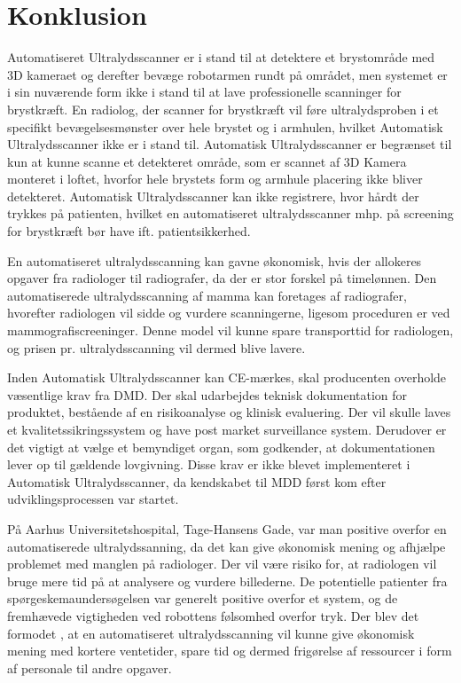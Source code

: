\chapter{Konklusion}\label{kapitel_Konklusion}
Automatiseret Ultralydsscanner er i stand til at detektere et brystområde med 3D kameraet og derefter bevæge robotarmen rundt på området, men systemet er i sin nuværende form ikke i stand til at lave professionelle scanninger for brystkræft. En radiolog, der scanner for brystkræft vil føre ultralydsproben i et specifikt bevægelsesmønster over hele brystet og i armhulen, hvilket Automatisk Ultralydsscanner ikke er i stand til. Automatisk Ultralydsscanner er begrænset til kun at kunne scanne et detekteret område, som er scannet af 3D Kamera monteret i loftet, hvorfor hele brystets form og armhule placering ikke bliver detekteret. Automatisk Ultralydsscanner kan ikke registrere, hvor hårdt der trykkes på patienten, hvilket en automatiseret ultralydsscanner mhp. på screening for brystkræft bør have ift. patientsikkerhed. 

En automatiseret ultralydsscanning kan gavne økonomisk, hvis der allokeres opgaver fra radiologer til radiografer, da der er stor forskel på timelønnen. Den automatiserede ultralydsscanning af mamma kan foretages af radiografer, hvorefter radiologen vil sidde og vurdere scanningerne, ligesom proceduren er ved mammografiscreeninger. Denne model vil kunne spare transporttid for radiologen, og prisen pr. ultralydsscanning vil dermed blive lavere.  

Inden Automatisk Ultralydsscanner kan CE-mærkes, skal producenten overholde væsentlige krav fra DMD. Der skal udarbejdes teknisk dokumentation for produktet, bestående af en risikoanalyse og klinisk evaluering. Der vil skulle laves et kvalitetssikringssystem og have post market surveillance system. Derudover er det vigtigt at vælge et bemyndiget organ, som godkender, at dokumentationen lever op til gældende lovgivning. Disse krav er ikke blevet implementeret i Automatisk Ultralydsscanner, da kendskabet til MDD først kom efter udviklingsprocessen var startet.

På Aarhus Universitetshospital, Tage-Hansens Gade, var man positive overfor en automatiserede ultralydssanning, da det kan give økonomisk mening og afhjælpe problemet med manglen på radiologer. Der vil være risiko for, at radiologen vil bruge mere tid på at analysere og vurdere billederne. 
De potentielle patienter fra spørgeskemaundersøgelsen var generelt positive overfor et system, og de fremhævede vigtigheden ved robottens følsomhed overfor tryk. Der blev det formodet , at en automatiseret ultralydsscanning vil kunne give økonomisk mening med kortere ventetider, spare tid og dermed frigørelse af ressourcer i form af personale til andre opgaver. 

